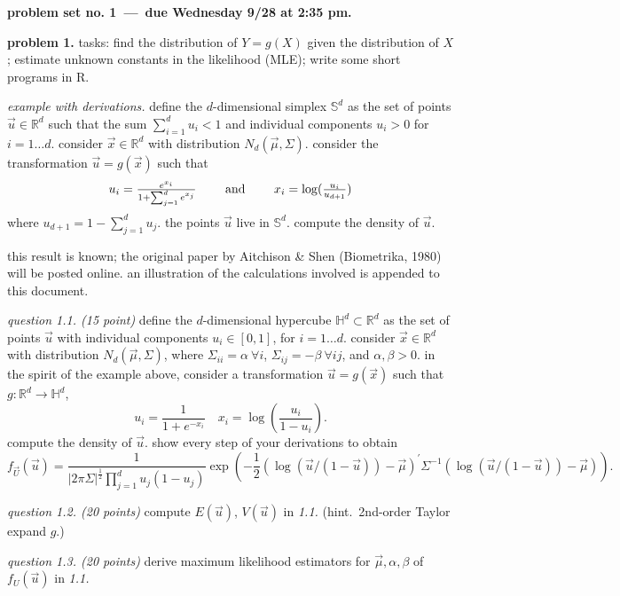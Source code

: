 \documentclass[11pt]{article}
\renewcommand{\b}[1]{\vec{#1}}
\newcommand{\pars}[1]{\left(#1\right)}
\begin{document}
\centerline{\textbf{problem set no. 1~---~due Wednesday 9/28 at 2:35 pm.}}


\textbf{problem 1.}
tasks: find the distribution of $Y=g(X)$ given the distribution of $X$; estimate unknown constants in the likelihood (MLE); write some short programs in R.

{\em example with derivations.} define the $d$-dimensional simplex $\mathbb{S}^d$ as the set of points $\vec u \in \mathbb{R}^d$ such that the sum $\sum_{i=1}^d u_i <1$ and individual components $u_i>0$ for $i=1\dots d$. consider $\vec x \in \mathbb{R}^d$ with distribution $N_d(\vec \mu, \Sigma)$. consider the transformation $\vec u = g(\vec x)$ such that
\[
 \textstyle
 u_i = \frac{e^{x_i}}{1+\sum_{j=1}^d e^{x_j}} \qquad \hbox{ and } \qquad x_i = \log (\frac{u_i}{u_{d+1}})
\]
where $u_{d+1} = 1-\sum_{j=1}^d u_j$. the points $\vec u$ live in $\mathbb{S}^d$. compute the density of $\vec u$.

this result is known; the original paper by Aitchison \& Shen (Biometrika, 1980) will be posted online. an illustration of the calculations involved is appended to this document.

{\em question 1.1. (15 point)} define the $d$-dimensional hypercube $\mathbb{H}^d \subset \mathbb{R}^d$ as the set of points $\vec u$ with individual components $u_i \in [0,1]$, for $i=1\dots d$. consider $\vec x \in \mathbb{R}^d$ with distribution $N_d(\vec \mu, \Sigma)$, where $\Sigma_{ii}=\alpha~\forall i$, $\Sigma_{ij}=-\beta~\forall ij$, and $\alpha,\beta>0$. in the spirit of the example above, consider a transformation $\vec u = g(\vec x)$ such that $g:\mathbb{R}^d \rightarrow \mathbb{H}^d$,
\[
 \textstyle
	u_i = \frac{1}{1 + e^{-x_i}} \quad x_i = \log\pars{\frac{u_i}{1-u_i}}.
\]
 compute the density of $\vec u$. show every step of your derivations to obtain
%
\[
 f_{\b{U}}(\b{u}) = \frac{1}{|2\pi \Sigma|^\frac{1}{2} \prod_{j=1}^d u_j (1-u_j)} \exp\left(-\frac{1}{2} \left(\log(\b{u} / (1 - \b{u})) - \b{\mu}\right)^\prime \Sigma^{-1} \left(\log(\b{u} / (1 - \b{u})) - \b{\mu}\right)\right).
\]

{\em question 1.2. (20 points)} compute $E(\vec u)$, $V(\vec u)$ in {\em 1.1.} 
%
(hint.\ 2nd-order Taylor expand $g$.)

{\em question 1.3. (20 points)} derive maximum likelihood estimators for $\vec \mu, \alpha, \beta$ of $f_U(\vec u)$ in {\em 1.1.}
\end{document}
